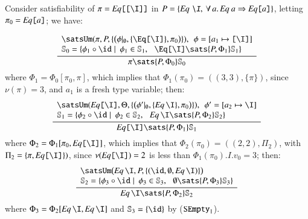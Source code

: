 \documentclass[review]{elsarticle}
\begin{document}
\begin{Example}
\label{EqL}
{\rm Consider satisfiability of $\pi = \text{{\tt {\it
        Eq\/}[[\I]]}}$ in $P = \{ \text{\it Eq \I\/},\: \forall\,
  a.\,\text{\it Eq\/}\: a \Rightarrow \text{{\tt {\it Eq\/}[$a$]}}
  \}$, letting $\pi_0 = \text{{\tt {\it Eq\/}[$a$]}}$; we have:

  \[ \displaystyle\frac{
         \begin{array}{l}
            \satsUm (\pi,P,
               \{ \bigl( \phi |_\emptyset,
                         \{ \text{\tt{\Eq[\I]}} \}, \pi_0\bigr) \}), \:\: \phi = [a_1\mapsto \text{\tt [\I]}]\\
               \mathbb{S}_0 = \{ \phi_1\circ \id \mid \: \phi_1 \in \mathbb{S}_1,\:\:\:
                \text{\tt{\Eq[\I]}} \sats {P,\Phi_1} \mathbb{S}_1\}
         \end{array}}
      {\pi \sats {P,\Phi_0} \mathbb{S}_0}
  \]
where $\Phi_1 = \Phi_0[\pi_0,\pi]$, which implies that $\Phi_1(\pi_0) = ((3, 3), \{ \pi \} )$,  since
      $\nu(\pi) = 3$, and
      $a_1$ is a fresh type variable; then:
  \[ \displaystyle\frac{
         \begin{array}{l}
            \satsUm(\text{\tt {\it Eq\/}[\I]},\Theta,
              \{\bigl(\phi'|_\emptyset,
                     \{ \text{{\tt {\it Eq\/}}}\,\I \}, \pi_0\bigr)\}), \:\: \phi' = [a_2\mapsto \I]\\
            \mathbb{S}_1 = \{ \phi_2\circ \id \mid \: \phi_2 \in \mathbb{S}_2,\:\:\:
             \text{\it Eq\/}\,\I \sats {P,\Phi_2} \mathbb{S}_2\}
         \end{array}}
      {\text{{\tt {\it Eq\/}[\I]}} \sats {P,\Phi_1} \mathbb{S}_1}
  \]
where $\Phi_2 = \Phi_1[\pi_0,\text{\tt {\it Eq\/}[\I]}]$, which implies that
      $\Phi_2(\pi_0) = ((2,2), \Pi_2)$, with $\Pi_2 = \{ \pi, \text{\tt{\it Eq\/}[\I]}  \}  )$, since
      $\nu(\text{\tt{\it Eq\/}[\I]}) = 2$ is less than
       $\Phi_1(\pi_0).I.v_0 = 3$; then:
  \[ \displaystyle\frac{
         \begin{array}{l}
            \satsUm\bigl(\text{\it Eq\/}\,\I,P, \{ (\id, \emptyset, \text{\it Eq\/}\,\I ) \}\bigr)\\
            \mathbb{S}_2 = \{ \phi_3\circ \id \mid \: \phi_3 \in \mathbb{S}_3,\:\:\:
            \emptyset \sats {P,\Phi_3} \mathbb{S}_3\}
         \end{array}}
      {\text{\it Eq\/}\,\I \sats {P,\Phi_2} \mathbb{S}_2}
  \]
where $\Phi_3 = \Phi_2[\text{\it Eq\/}\,\I,\text{\it Eq\/}\,\I]$
      and $\mathbb{S}_3 = \{ \id\}$ by ($\text{\tt SEmpty}_1$).}
\end{Example}
\end{document}
